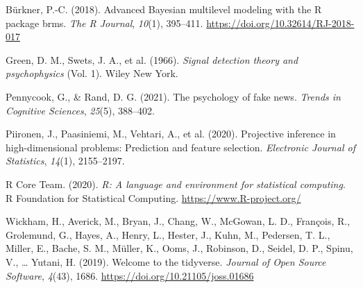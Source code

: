 \documentclass[
  man,floatsintext]{apa6}
\newlength{\cslhangindent}
\newlength{\cslentryspacingunit} %
\newenvironment{CSLReferences}[2] %
 {%
  \setlength{\parindent}{0pt}
  \ifodd #1
  \let\oldpar\par
  \def\par{\hangindent=\cslhangindent\oldpar}
  \fi
  \setlength{\parskip}{#2\cslentryspacingunit}
 }%
 {}
\begin{document}
\setlength{\parindent}{-0.5in}
\setlength{\leftskip}{0.5in}
\setlength{\parskip}{8pt}

\hypertarget{refs}{}
\begin{CSLReferences}{1}{0}
\leavevmode{}%
Bürkner, P.-C. (2018). Advanced {Bayesian} multilevel modeling with the {R} package {brms}. \emph{The R Journal}, \emph{10}(1), 395--411. \url{https://doi.org/10.32614/RJ-2018-017}

\leavevmode{}%
Green, D. M., Swets, J. A., et al. (1966). \emph{Signal detection theory and psychophysics} (Vol. 1). Wiley New York.

\leavevmode{}%
Pennycook, G., \& Rand, D. G. (2021). The psychology of fake news. \emph{Trends in Cognitive Sciences}, \emph{25}(5), 388--402.

\leavevmode{}%
Piironen, J., Paasiniemi, M., Vehtari, A., et al. (2020). Projective inference in high-dimensional problems: Prediction and feature selection. \emph{Electronic Journal of Statistics}, \emph{14}(1), 2155--2197.

\leavevmode{}%
R Core Team. (2020). \emph{R: A language and environment for statistical computing}. R Foundation for Statistical Computing. \url{https://www.R-project.org/}

\leavevmode{}%
Wickham, H., Averick, M., Bryan, J., Chang, W., McGowan, L. D., François, R., Grolemund, G., Hayes, A., Henry, L., Hester, J., Kuhn, M., Pedersen, T. L., Miller, E., Bache, S. M., Müller, K., Ooms, J., Robinson, D., Seidel, D. P., Spinu, V., \ldots{} Yutani, H. (2019). Welcome to the {tidyverse}. \emph{Journal of Open Source Software}, \emph{4}(43), 1686. \url{https://doi.org/10.21105/joss.01686}

\end{CSLReferences}


\clearpage
\makeatletter
\efloat@restorefloats
\makeatother
\end{document}
